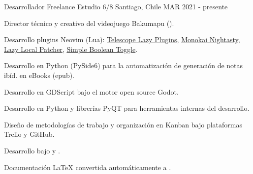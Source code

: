

\begin{cventries}

  \cventry
    {Desarrollador Freelance} %
    {Estudio 6/8} %
    {Santiago, Chile} %
    {MAR 2021 - presente} %
    {
      \begin{cvitems} %
        \item {Director técnico y creativo del videojuego Bakumapu ().}
        \item {Desarrollo plugins Neovim (Lua):
          \href{https://github.com/polirritmico/telescope-lazy-plugins.nvim}{Telescope Lazy Plugins},
          \href{https://github.com/polirritmico/monokai-nightasty.nvim}{Monokai Nightasty}},
          \href{https://github.com/polirritmico/lazy-local-patcher.nvim}{Lazy Local Patcher},
          \href{https://github.com/polirritmico/simple-boolean-toggle.nvim}{Simple Boolean Toggle}.
        \item {Desarrollo en Python (PySide6) para la automatización de generación de notas ibíd. en eBooks (epub).}
        \item {Desarrollo en GDScript bajo el motor open source Godot.}
        \item {Desarrollo en Python y librerías PyQT para herramientas internas del desarrollo.}
        \item {Diseño de metodologías de trabajo y organización en Kanban bajo plataformas Trello y GitHub.}
        \item {Desarrollo bajo  y .}
        \item {Documentación LaTeX convertida automáticamente a .}
      \end{cvitems}
    }


\end{cventries}

